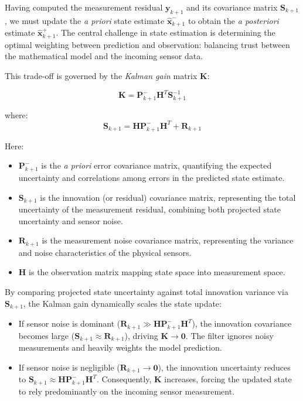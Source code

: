 \documentclass{article}
\begin{document}
	Having computed the measurement residual $\mathbf{y}_{k+1}$ and its covariance matrix $\mathbf{S}_{k+1}$, we must update the \emph{a priori} state estimate $\hat{\mathbf{x}}_{k+1}^-$ to obtain the \emph{a posteriori} estimate $\hat{\mathbf{x}}_{k+1}^+$. The central challenge in state estimation is determining the optimal weighting between prediction and observation: balancing trust between the mathematical model and the incoming sensor data.
	
	This trade-off is governed by the \emph{Kalman gain} matrix $\mathbf{K}$:
	
	\begin{equation}
		\mathbf{K} = \mathbf{P}_{k+1}^{-} \mathbf{H}^T \mathbf{S}_{k+1}^{-1}
		\label{eq:kalman_gain}
	\end{equation}
	
	\noindent where:
	\begin{equation}
		\mathbf{S}_{k+1} = \mathbf{H} \mathbf{P}_{k+1}^{-} \mathbf{H}^T + \mathbf{R}_{k+1}
		\label{eq:innovation_covariance_ref}
	\end{equation}
	
	\noindent Here:
	\begin{itemize}
		\item $\mathbf{P}_{k+1}^-$ is the \emph{a priori} error covariance matrix, quantifying the expected uncertainty and correlations among errors in the predicted state estimate.
		\item $\mathbf{S}_{k+1}$ is the innovation (or residual) covariance matrix, representing the total uncertainty of the measurement residual, combining both projected state uncertainty and sensor noise.
		\item $\mathbf{R}_{k+1}$ is the measurement noise covariance matrix, representing the variance and noise characteristics of the physical sensors.
		\item $\mathbf{H}$ is the observation matrix mapping state space into measurement space.
	\end{itemize}
	
	\noindent By comparing projected state uncertainty against total innovation variance via $\mathbf{S}_{k+1}$, the Kalman gain dynamically scales the state update:
	\begin{itemize}
		\item If sensor noise is dominant ($\mathbf{R}_{k+1} \gg \mathbf{H} \mathbf{P}_{k+1}^- \mathbf{H}^T$), the innovation covariance becomes large ($\mathbf{S}_{k+1} \approx \mathbf{R}_{k+1}$), driving $\mathbf{K} \to \mathbf{0}$. The filter ignores noisy measurements and heavily weights the model prediction.
		\item If sensor noise is negligible ($\mathbf{R}_{k+1} \to \mathbf{0}$), the innovation uncertainty reduces to $\mathbf{S}_{k+1} \approx \mathbf{H} \mathbf{P}_{k+1}^- \mathbf{H}^T$. Consequently, $\mathbf{K}$ increases, forcing the updated state to rely predominantly on the incoming sensor measurement.
	\end{itemize}
	
\end{document}
